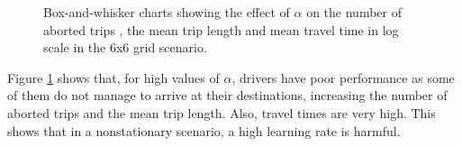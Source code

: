 \documentclass{RITA}
\begin{document}
\begin{figure}
  \centering
  \caption{Box-and-whisker charts showing the effect of $\alpha$ on the number of aborted trips , the mean trip length  and mean travel time in log scale  in the 6x6 grid scenario.}
  \label{fig:qLearningAlpha-grid}
\end{figure}

Figure \ref{fig:qLearningAlpha-grid} shows that, for high values of $\alpha$, drivers have poor performance as some of them do not manage to arrive at their destinations, increasing the number of aborted trips and the mean trip length. Also, travel times are very high. This shows that in a nonstationary scenario, a high learning rate is harmful.
\end{document}
